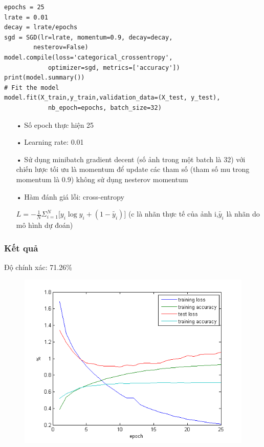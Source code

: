 \documentclass[a4paper,12pt]{report}
\begin{document}
\begin{itemize}
\begin{lstlisting}
epochs = 25
lrate = 0.01
decay = lrate/epochs
sgd = SGD(lr=lrate, momentum=0.9, decay=decay, 
		nesterov=False)
model.compile(loss='categorical_crossentropy', 
			optimizer=sgd, metrics=['accuracy'])
print(model.summary())
# Fit the model
model.fit(X_train,y_train,validation_data=(X_test, y_test), 
			nb_epoch=epochs, batch_size=32)
\end{lstlisting}
\begin{itemize}
\item[•] Số epoch thực hiện 25
\item[•] Learning rate: 0.01
\item[•] Sử dụng minibatch gradient decent (số ảnh trong một batch là 32) với chiến lược tối ưu là momentum để update các tham số (tham số mu trong momentum là 0.9) không sử dụng nesterov momentum
\item[•] Hàm đánh giá lỗi: cross-entropy \\
\begin{center}
$L = -\frac{1}{N}\Sigma_{i=1}^{N}\big[y_i\log y_i + (1-\tilde{y_i})\big]$ (c là nhãn thực tế của ảnh i,$\tilde{y_i}$ là nhãn do mô hình dự đoán)
\end{center}
\end{itemize}
\end{itemize}
\subsubsection{Kết quả}
Độ chính xác: 71.26\%
\begin{figure}[H]
\begin{center}
\includegraphics[width =1.0 \textwidth]{testImg.png}
\end{center}
\end{figure}
\end{document}
